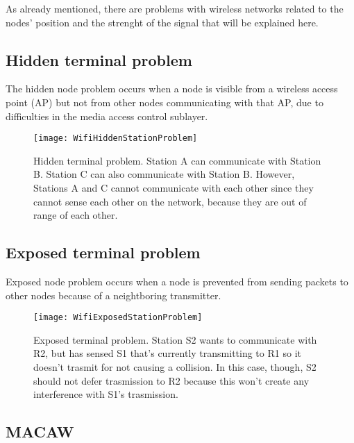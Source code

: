 As already mentioned, there are problems with wireless networks related to the
nodes' position and the strenght of the signal that will be explained here.

\subsection{Hidden terminal problem}

The hidden node problem occurs when a node is visible from a wireless access
point (AP) but not from other nodes communicating with that AP, due to
difficulties in the media access control sublayer.

\begin{figure}[t]
  \centering
  \texttt{[image: WifiHiddenStationProblem]}
  \caption[Hidden terminal problem]{Hidden terminal problem. Station A can
    communicate with Station B. Station C can also communicate with Station B.
    However, Stations A and C cannot communicate with each other since they
    cannot sense each other on the network, because they are out of range of
    each other.}
\end{figure}

\subsection{Exposed terminal problem}

Exposed node problem occurs when a node is prevented from sending packets to
other nodes because of a neightboring transmitter.

\begin{figure}[t]
  \centering
  \texttt{[image: WifiExposedStationProblem]}
  \caption[Exposed terminal problem]{Exposed terminal problem. Station S2
    wants to communicate with R2, but has sensed S1 that's currently
    transmitting to R1 so it doesn't trasmit for not causing a collision. In
    this case, though, S2 should not defer trasmission to R2 because this won't
    create any interference with S1's trasmission.}
\end{figure}

\subsection{MACAW} 

